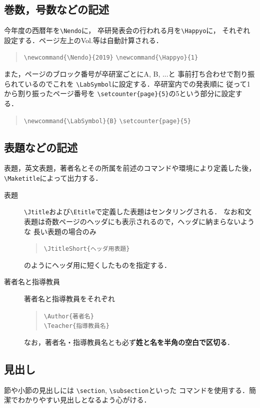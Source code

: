 \documentclass[a4j, 9pt, twocolumn, twoside]{jsarticle}
\newcommand{\Jtitle}{機械学習を用いた天気予報システムの作成}
\newcommand{\JtitleShort}{\Jtitle} %
\newcommand{\Etitle}{Creating a weather forecast system using machine learning}
\newcommand{\Author}{清水 翔仁}  %
\newcommand{\Teacher}{大矢 健一}
\newcommand{\Nendo}{2019}  %
\newcommand{\Happyo}{1}    %
\newcommand{\LabSymbol}{B}  %
\begin{document}
\subsection{巻数，号数などの記述}
今年度の西暦年を\texttt{\textbackslash Nendo}に，
卒研発表会の行われる月を\texttt{\textbackslash Happyo}に，
それぞれ設定する．ページ左上のVol.等は自動計算される．
\begin{quote}\small
\verb+\newcommand{\Nendo}{2019}+
\verb+\newcommand{\Happyo}{1}+
\end{quote}

また，ページのブロック番号が卒研室ごとにA, B, ...と
事前打ち合わせで割り振られているのでこれを
\verb+\LabSymbol+に設定する．卒研室内での発表順に
従って1から割り振ったページ番号を
\verb+\setcounter{page}{5}+の5という部分に設定する．

\begin{quote}\small
\verb+\newcommand{\LabSymbol}{B}+
\verb+\setcounter{page}{5}+
\end{quote}

\subsection{表題などの記述}\label{sec:Desc}\label{sec:DESC}
表題，英文表題，著者名とその所属を前述のコマンドや環境により定義した後，
\texttt{\textbackslash Maketitle}によって出力する．

\begin{description}
\item[表題]{\verb+\Jtitle+および\verb+\Etitle+で定義した表題はセンタリングされる．
なお和文表題は奇数ページのヘッダにも表示されるので，ヘッダに納まらないような
長い表題の場合のみ
\begin{quote}\small
\verb+\JtitleShort{ヘッダ用表題}+
\end{quote}
のようにヘッダ用に短くしたものを指定する．}
\item[著者名と指導教員]{著者名と指導教員をそれぞれ
\begin{quote}\small
\verb+\Author{著者名}+\\
\verb+\Teacher{指導教員名}+
\end{quote}
なお，著者名・指導教員名とも必ず\textbf{姓と名を半角の空白で区切る}．}
\end{description}

\subsection{見出し}
節や小節の見出しには \verb+\section+, \verb+\subsection+といった
コマンドを使用する．簡潔でわかりやすい見出しとなるよう心がける．
\end{document}
